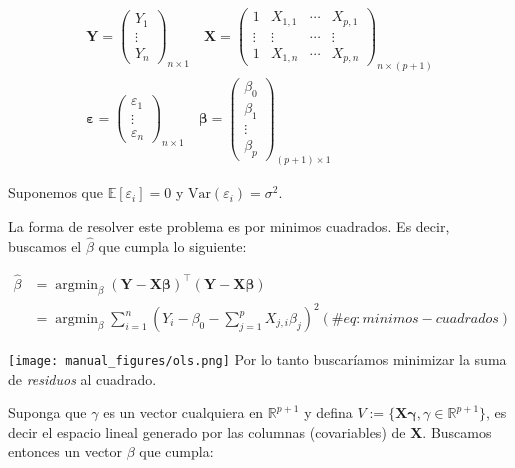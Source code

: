 \documentclass[
  12pt,
]{book}
\begin{document}
\begin{multline*}
\boldsymbol{Y} = 
\begin{pmatrix}
Y_{1} \\
\vdots \\
Y_{n}
\end{pmatrix}_{n\times 1} 
\quad 
\boldsymbol{X} = 
\begin{pmatrix}
1 & X_{1,1} & \cdots & X_{p,1} \\
\vdots & \vdots & \cdots & \vdots\\
1 & X_{1,n}& \cdots & X_{p,n}
\end{pmatrix}_{n\times (p+1)}
\\
\boldsymbol{\varepsilon} = 
\begin{pmatrix}
\varepsilon_{1} \\
\vdots \\
\varepsilon_{n}
\end{pmatrix}_{n\times 1} 
\quad 
\boldsymbol{\beta} = 
\begin{pmatrix}
\beta_{0} \\
\beta_{1} \\
\vdots \\
\beta_{p}
\end{pmatrix}_{(p+1)\times 1} 
\end{multline*}

Suponemos que \(\mathbb{E}\left[\varepsilon_{i}\right] = 0\) y
\(\mathrm{Var}\left(\varepsilon_{i}\right) = \sigma^{2}\).

La forma de resolver este problema es por minimos cuadrados. Es decir,
buscamos el \(\hat{\beta}\) que cumpla lo siguiente:

\begin{align}
\hat{\beta} &= 
 \operatorname{argmin}_\beta (\boldsymbol{Y} - \boldsymbol{X} \boldsymbol{\beta})^{\top} (\boldsymbol{Y} - \boldsymbol{X} \boldsymbol{\beta})\\
 &=  \operatorname{argmin}_\beta \sum_{i=1}^n \left( Y_{i} -\beta_{0} - \sum_{j=1}^p X_{j,i} \beta_{j} \right)^2 
 (\#eq:minimos-cuadrados)
 \end{align}

\texttt{[image: manual\_figures/ols.png]} Por lo tanto buscaríamos
minimizar la suma de \emph{residuos} al cuadrado.

Suponga que \(\gamma\) es un vector cualquiera en \(\mathbb{R}^{p+1}\) y
defina
\(V := \{\boldsymbol{X}\boldsymbol{\gamma}, \gamma \in \mathbb{R}^{p+1}\}\),
es decir el espacio lineal generado por las columnas (covariables) de
\(\boldsymbol{X}\). Buscamos entonces un vector \(\beta\) que cumpla:
\end{document}
